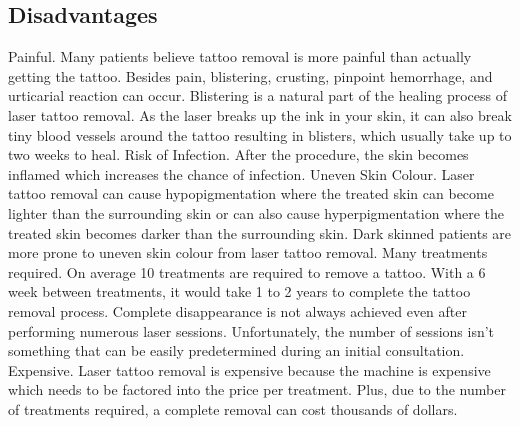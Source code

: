 \documentclass[12pt]{article}
\begin{document}
\subsection{Disadvantages}

Painful. Many patients believe tattoo removal is more painful than actually getting the tattoo. Besides pain, blistering, crusting, pinpoint hemorrhage, and urticarial reaction can occur. Blistering is a natural part of the healing process of laser tattoo removal.  As the laser breaks up the ink in your skin, it can also break tiny blood vessels around the tattoo resulting in blisters, which usually take up to two weeks to heal.
Risk of Infection. After the procedure, the skin becomes inflamed which increases the chance of infection.
Uneven Skin Colour. Laser tattoo removal can cause hypopigmentation where the treated skin can become lighter than the surrounding skin or can also cause hyperpigmentation where the treated skin becomes darker than the surrounding skin. Dark skinned patients are more prone to uneven skin colour from laser tattoo removal.
Many treatments required. On average 10 treatments are required to remove a tattoo.  With a 6 week between treatments, it would take 1 to 2 years to complete the tattoo removal process. Complete disappearance is not always achieved even after performing numerous laser sessions.  Unfortunately, the number of sessions isn’t something that can be easily predetermined during an initial consultation.
Expensive.  Laser tattoo removal is expensive because the machine is expensive which needs to be factored into the price per treatment.  Plus, due to the number of treatments required, a complete removal can cost thousands of dollars.
\end{document}
